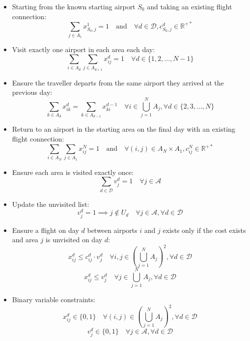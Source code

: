 \begin{itemize}
    \item Starting from the known starting airport \(S_{0}\) and taking an existing flight connection:
          \[
          \sum_{j \in A_1} x_{S_0,j}^1 = 1 \quad \text{and} \quad \forall d \in \mathcal{D}, c_{S_0,j}^{d} \in \mathbb{R}^{+*}
          \]

    \item Visit exactly one airport in each area each day:
          \[
          \sum_{i \in A_d} \sum_{j \in A_{d+1}} x_{ij}^d = 1 \quad \forall d \in \{1, 2, \ldots, N-1\}
          \]

    \item Ensure the traveller departs from the same airport they arrived at the previous day:
          \[
          \sum_{k \in A_d} x_{ik}^d = \sum_{k \in A_{d-1}} x_{ki}^{d-1} \quad \forall i \in \bigcup_{j=1}^N A_j, \forall d \in \{2, 3, \ldots, N\}
          \]

    \item Return to an airport in the starting area on the final day with an existing flight connection:
          \[
          \sum_{i \in A_N} \sum_{j \in A_1} x_{ij}^N = 1 \quad \text{and} \quad \forall (i,j) \in A_N \times A_1, c_{ij}^{N} \in \mathbb{R}^{+*}
          \]

    \item Ensure each area is visited exactly once:
          \[
          \sum_{d \in \mathcal{D}} v_j^d = 1 \quad \forall j \in \mathcal{A}
          \]

    \item Update the unvisited list:
          \[
          v_j^d = 1 \implies j \notin U_d \quad \forall j \in \mathcal{A}, \forall d \in \mathcal{D}
          \]

    \item Ensure a flight on day \(d\) between airports \(i\) and \(j\) exists only if the cost exists and area \(j\) is unvisited on day \(d\):
          \[
          x_{ij}^d \leq c_{ij}^d \cdot v_j^d \quad \forall i, j \in \left( \bigcup_{j=1}^N A_j \right)^2, \forall d \in \mathcal{D}
          \]
          \[
          x_{ij}^d \leq v_j^d \quad \forall j \in \bigcup_{j=1}^N A_j, \forall d \in \mathcal{D}
          \]

    \item Binary variable constraints:
          \[
          x_{ij}^d \in \{0, 1\} \quad \forall (i, j) \in \left( \bigcup_{j=1}^N A_j \right)^2, \forall d \in \mathcal{D}
          \]
          \[
          v_j^d \in \{0, 1\} \quad \forall j \in \mathcal{A}, \forall d \in \mathcal{D}
          \]
\end{itemize}

